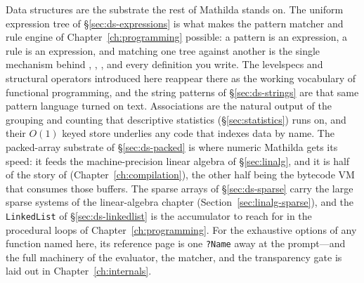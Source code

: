 Data structures are the substrate the rest of Mathilda stands on. The uniform
expression tree of \S\ref{sec:ds-expressions} is what makes the pattern matcher and
rule engine of Chapter~\ref{ch:programming} possible: a pattern is an expression, a
rule is an expression, and matching one tree against another is the single mechanism
behind , , , and every definition you write. The
levelspecs and structural operators introduced here reappear there as the working
vocabulary of functional programming, and the string patterns of
\S\ref{sec:ds-strings} are that same pattern language turned on text. Associations are the natural output of the
grouping and counting that descriptive statistics (\S\ref{sec:statistics}) runs on,
and their \(O(1)\) keyed store underlies any code that indexes data by name. The
packed-array substrate of \S\ref{sec:ds-packed} is where numeric Mathilda gets its
speed: it feeds the machine-precision linear algebra of \S\ref{sec:linalg}, and it is
half of the story of  (Chapter~\ref{ch:compilation}), the other half being
the bytecode VM that consumes those buffers. The sparse arrays of
\S\ref{sec:ds-sparse} carry the large sparse systems of the linear-algebra chapter
(Section~\ref{sec:linalg-sparse}), and the \texttt{LinkedList} of
\S\ref{sec:ds-linkedlist} is the accumulator to reach for in the procedural loops of
Chapter~\ref{ch:programming}. For the exhaustive options of any
function named here, its reference page is one \texttt{?Name} away at the prompt---and
the full machinery of the evaluator, the matcher, and the transparency gate is laid
out in Chapter~\ref{ch:internals}.
